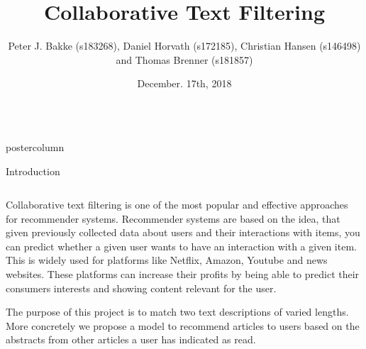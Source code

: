 \documentclass[final,hyperref={pdfpagelabels=false}]{beamer}
\title{
\huge Collaborative Text Filtering}
\author{Peter J. Bakke (s183268), Daniel Horvath (s172185), Christian Hansen (s146498) and Thomas Brenner (s181857)}
\institute[Department]{\small DTU Compute, Technical University of Denmark}
\date[December. 17th, 2018]{December. 17th, 2018}
\newlength{\columnheight}
\begin{document}
\begin{frame}
 \begin{columns}
 \begin{column}{.49\paperwidth}
 \begin{beamercolorbox}[center,wd=\textwidth]{postercolumn}
 \begin{minipage}[T]{.99\textwidth}  %
 \parbox[t][\columnheight]{\textwidth}{ %

\begin{block}{Introduction}
 \begin{columns}
 \begin{column}{1\textwidth}



\centering
\begin{minipage}[t]{0.98\textwidth}

\footnotesize{Collaborative text filtering is one of the most popular and effective approaches for recommender systems. Recommender systems are based on the idea, that given previously collected data about users and their interactions with items, you can predict whether a given user wants to have an interaction with a given item. This is widely used for platforms like Netflix, Amazon, Youtube and news websites. These platforms can increase their profits by being able to predict their consumers interests and showing content relevant for the user. 

The purpose of this project is to match two text descriptions of varied lengths. More concretely we propose a model to recommend articles to users based on the abstracts from other articles a user has indicated as read.
\vspace{0.5cm}
}



\end{minipage} \hspace{1cm}


      
\end{column}
 \end{columns}
 \end{block}
 \vfill


}
\end{minipage}
\end{beamercolorbox}
\end{column}
\end{columns}
\end{frame}
\end{document}
